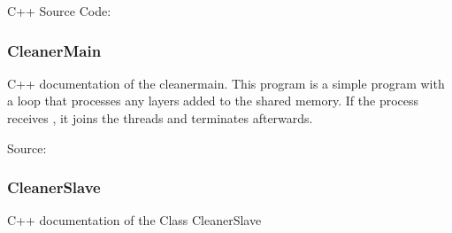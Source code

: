 \documentclass[a4paper,10pt,english]{sphinxmanual}
\begin{document}
C++ Source Code: {\hyperref[\detokenize{source_code/cleanermaster_source:cmsource}]{}}


\subsubsection{CleanerMain}
\label{\detokenize{drc/drc:cleanermain}}\label{\detokenize{drc/drc:cmain}}
C++ documentation of the cleanermain. This program is a simple program with a loop that processes any layers added to the shared memory. If the process receives , it joins the threads and terminates afterwards.

Source: {\hyperref[\detokenize{source_code/cleanermain_source:cmainsource}]{}}


\subsubsection{CleanerSlave}
\label{\detokenize{drc/drc:cleanerslave}}\label{\detokenize{drc/drc:cs}}
C++ documentation of the Class CleanerSlave
\end{document}

